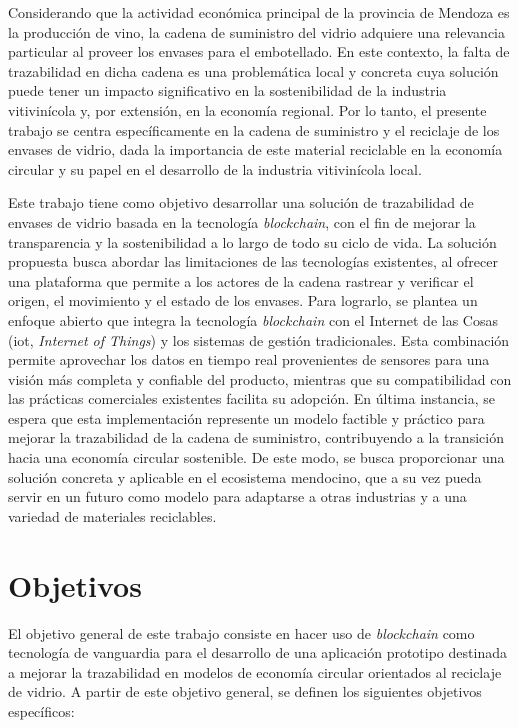 Considerando que la actividad económica principal de la provincia de Mendoza es la producción de vino, la cadena de suministro del vidrio adquiere una relevancia particular al proveer los envases para el embotellado. En este contexto, la falta de trazabilidad en dicha cadena es una problemática local y concreta cuya solución puede tener un impacto significativo en la sostenibilidad de la industria vitivinícola y, por extensión, en la economía regional. Por lo tanto, el presente trabajo se centra específicamente en la cadena de suministro y el reciclaje de los envases de vidrio, dada la importancia de este material reciclable en la economía circular y su papel en el desarrollo de la industria vitivinícola local.

Este trabajo tiene como objetivo desarrollar una solución de trazabilidad de envases de vidrio basada en la tecnología \textit{blockchain}, con el fin de mejorar la transparencia y la sostenibilidad a lo largo de todo su ciclo de vida. La solución propuesta busca abordar las limitaciones de las tecnologías existentes, al ofrecer una plataforma que permite a los actores de la cadena rastrear y verificar el origen, el movimiento y el estado de los envases. Para lograrlo, se plantea un enfoque abierto que integra la tecnología \textit{blockchain} con el Internet de las Cosas (\gls{iot}, \textit{Internet of Things}) y los sistemas de gestión tradicionales. Esta combinación permite aprovechar los datos en tiempo real provenientes de sensores para una visión más completa y confiable del producto, mientras que su compatibilidad con las prácticas comerciales existentes facilita su adopción. En última instancia, se espera que esta implementación represente un modelo factible y práctico para mejorar la trazabilidad de la cadena de suministro, contribuyendo a la transición hacia una economía circular sostenible. De este modo, se busca proporcionar una solución concreta y aplicable en el ecosistema mendocino, que a su vez pueda servir en un futuro como modelo para adaptarse a otras industrias y a una variedad de materiales reciclables.

\section{Objetivos}
\label{sec:goals}

El objetivo general de este trabajo consiste en hacer uso de \textit{blockchain} como tecnología de vanguardia para el desarrollo de una aplicación prototipo destinada a mejorar la trazabilidad en modelos de economía circular orientados al reciclaje de vidrio. A partir de este objetivo general, se definen los siguientes objetivos específicos:

